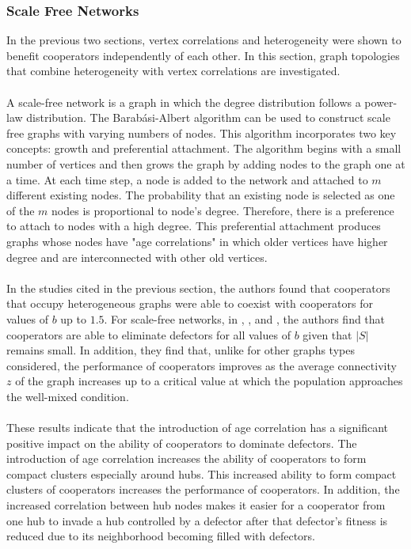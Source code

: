 \documentclass{article}
\begin{document}
	\subsubsection{Scale Free Networks}
	In the previous two sections, vertex correlations and heterogeneity were shown to benefit cooperators independently of each other.  In this section, graph topologies that combine heterogeneity with vertex correlations are investigated.
	\paragraph{}A scale-free network is a graph in which the degree distribution follows a power-law distribution.  The Barab\'{a}si-Albert algorithm can be used to construct scale free graphs with varying numbers of nodes.  This algorithm incorporates two key concepts: growth and preferential attachment.  The algorithm begins with a small number of vertices and then grows the graph by adding nodes to the graph one at a time.  At each time step, a node is added to the network and attached to $m$ different existing nodes.  The probability that an existing node is selected as one of the $m$ nodes is proportional to node's degree.  Therefore, there is a preference to attach to nodes with a high degree.  This preferential attachment produces graphs whose nodes have "age correlations" in which older vertices have higher degree and are interconnected with other old vertices.
	\paragraph{}In the studies cited in the previous section, the authors found that cooperators that occupy heterogeneous graphs were able to coexist with cooperators for values of $b$ up to $1.5$.  For scale-free networks, in \cite{Pacheco2005}, \cite{Santos2006a}, \cite{Santos2006b} and \cite{Santos2006c}, the authors find that cooperators are able to eliminate defectors for all values of $b$ given that $|S|$ remains small.  In addition, they find that, unlike for other graphs types considered, the performance of cooperators improves as the average connectivity $z$ of the graph increases up to a critical value at which the population approaches the well-mixed condition.
	\paragraph{}These results indicate that the introduction of age correlation has a significant positive impact on the ability of cooperators to dominate defectors.  The introduction of age correlation increases the ability of cooperators to form compact clusters especially around hubs.  This increased ability to form compact clusters of cooperators increases the performance of cooperators.  In addition, the increased correlation between hub nodes makes it easier for a cooperator from one hub to invade a hub controlled by a defector after that defector's fitness is reduced due to its neighborhood becoming filled with defectors.
\end{document}
